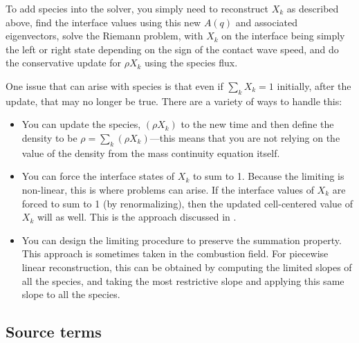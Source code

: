To add species into the solver, you simply need to reconstruct $X_k$
as described above, find the interface values using this new $A(q)$
and associated eigenvectors, solve the Riemann problem, with $X_k$ on
the interface being simply the left or right state depending on the
sign of the contact wave speed, and do the conservative update for
$\rho X_k$ using the species flux.

One issue that can arise with species is that even if $\sum_k X_k = 1$
initially, after the update, that may no longer be true.  There are a
variety of ways to handle this:
\begin{itemize}
\item You can update the species, $(\rho X_k)$ to the new time and then
define the density to be $\rho = \sum_k (\rho X_k)$---this means that
you are not relying on the value of the density from the mass continuity
equation itself.

\item You can force the interface states of $X_k$ to sum to 1.  Because
the limiting is non-linear, this is where problems can arise.  If the
interface values of $X_k$ are forced to sum to 1 (by renormalizing), then
the updated cell-centered value of $X_k$ will as well.  This is the
approach discussed in \cite{plewamuller:1999}.

\item You can design the limiting procedure to preserve the summation
property.  This approach is sometimes taken in the combustion field.
For piecewise linear reconstruction, this can be obtained by computing
the limited slopes of all the species, and taking the most restrictive
slope and applying this same slope to all the species.
\end{itemize}


\subsection{Source terms}

